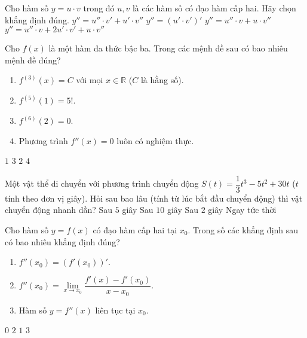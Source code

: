 \begin{ex}%
	Cho hàm số $y=u\cdot v$ trong đó $u, v$ là các hàm số có đạo hàm cấp hai. Hãy chọn khẳng định đúng.
	\choice
	{$y''=u'' \cdot v'+u' \cdot v''$}
	{$y''=(u' \cdot v')'$}
	{$y''=u'' \cdot v+u \cdot v''$}
	{\True $y''=u'' \cdot v+2u' \cdot v'+u \cdot v''$}
\end{ex}

\begin{ex}%
	Cho $f(x)$ là một hàm đa thức bậc ba. Trong các mệnh đề sau có bao nhiêu mệnh đề đúng?
	\begin{enumerate}[(1)]
		\item $f^{(3)}(x)=C$ với mọi $x\in\mathbb{R}$ ($C$ là hằng số).
		\item $f^{(5)}(1)=5!$.
		\item $f^{(6)}(2)=0$.
		\item Phương trình $f''(x)=0$ luôn có nghiệm thực.
	\end{enumerate}
	\choice
	{$1$}
	{\True $3$}
	{$2$}
	{$4$}
\end{ex}

\begin{ex}%
	Một vật thể di chuyển với phương trình chuyển động $S(t)=\dfrac{1}{3}t^3-5t^2+30t$ ($t$ tính theo đơn vị giây). Hỏi sau bao lâu (tính từ lúc bắt đầu chuyển động) thì vật chuyển động nhanh dần?
	\choice
	{\True Sau $5$ giây}
	{Sau $10$ giây}
	{Sau $2$ giây}
	{Ngay tức thời}
\end{ex}

\begin{ex}%
	Cho hàm số $y=f(x)$ có đạo hàm cấp hai tại $x_0.$ Trong số các khẳng định sau có bao nhiêu khẳng định đúng?
	\begin{enumerate}[(1)]
		\item $f''(x_0)=(f'(x_0))'.$
		\item $f''(x_0)=\mathop {\lim }\limits_{x \to x_0}\dfrac{f'(x)-f'(x_0)}{x-x_0}.$
		\item Hàm số $y=f''(x)$ liên tục tại $x_0.$
	\end{enumerate}
	\choice
	{$0$}
	{$2$}
	{\True $1$}
	{$3$}
\end{ex}


